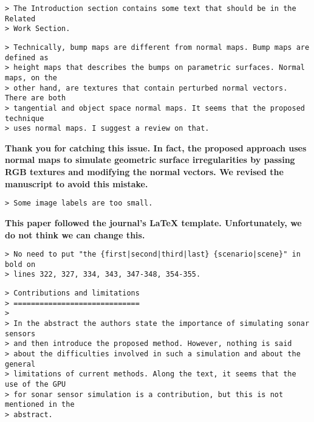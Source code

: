 \documentclass{article}
\begin{document}

\begin{verbatim}
> The Introduction section contains some text that should be in the Related
> Work Section.
\end{verbatim}


\begin{verbatim}
> Technically, bump maps are different from normal maps. Bump maps are defined as
> height maps that describes the bumps on parametric surfaces. Normal maps, on the
> other hand, are textures that contain perturbed normal vectors. There are both
> tangential and object space normal maps. It seems that the proposed technique
> uses normal maps. I suggest a review on that.
\end{verbatim}

\textbf{Thank you for catching this issue. In fact, the proposed approach uses
normal maps to simulate geometric surface irregularities by passing RGB textures
and modifying the normal vectors. We revised the manuscript to avoid this
mistake.}

\begin{verbatim}
> Some image labels are too small.
\end{verbatim}

\textbf{This paper followed the journal's LaTeX template. Unfortunately, we do not
think we can change this.}

\begin{verbatim}
> No need to put "the {first|second|third|last} {scenario|scene}" in bold on
> lines 322, 327, 334, 343, 347-348, 354-355.
\end{verbatim}


\begin{verbatim}
> Contributions and limitations
> =============================
>
> In the abstract the authors state the importance of simulating sonar sensors
> and then introduce the proposed method. However, nothing is said
> about the difficulties involved in such a simulation and about the general
> limitations of current methods. Along the text, it seems that the use of the GPU
> for sonar sensor simulation is a contribution, but this is not mentioned in the
> abstract.
\end{verbatim}
\end{document}
